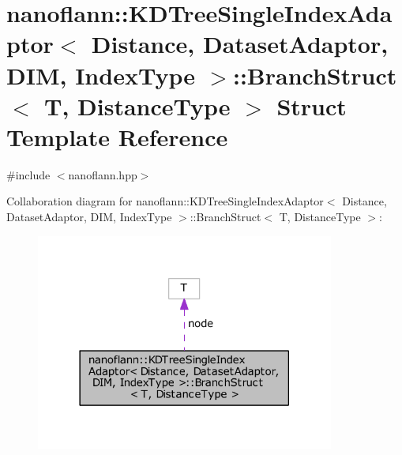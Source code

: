 \hypertarget{structnanoflann_1_1_k_d_tree_single_index_adaptor_1_1_branch_struct}{\section{nanoflann\-:\-:K\-D\-Tree\-Single\-Index\-Adaptor$<$ Distance, Dataset\-Adaptor, D\-I\-M, Index\-Type $>$\-:\-:Branch\-Struct$<$ T, Distance\-Type $>$ Struct Template Reference}
\label{structnanoflann_1_1_k_d_tree_single_index_adaptor_1_1_branch_struct}
}


{\ttfamily \#include $<$nanoflann.\-hpp$>$}



Collaboration diagram for nanoflann\-:\-:K\-D\-Tree\-Single\-Index\-Adaptor$<$ Distance, Dataset\-Adaptor, D\-I\-M, Index\-Type $>$\-:\-:Branch\-Struct$<$ T, Distance\-Type $>$\-:
\nopagebreak
\begin{figure}[H]
\begin{center}
\leavevmode
\includegraphics[width=278pt]{structnanoflann_1_1_k_d_tree_single_index_adaptor_1_1_branch_struct__coll__graph}
\end{center}
\end{figure}
